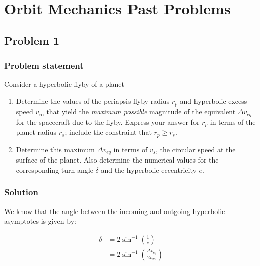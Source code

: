\newcommand{\v}[1]{\mathbf{#1}}
\newcommand{\dv}[1]{\dot{\v{#1}}}
\newcommand{\ddv}[1]{\ddot{\v{#1}}}
\newcommand{\uv}[1]{\hat{\v{#1}}}



\maketitle

\section{Orbit Mechanics Past Problems}

\subsection{Problem 1}

\subsubsection{Problem statement}
Consider a hyperbolic flyby of a planet

\begin{enumerate}
    \item Determine the values of the periapsis flyby radius $r_p$ and hyperbolic excess speed $v_\infty$ that yield the \textit{maximum possible} magnitude of the equivalent $\Delta v_{eq}$ for the spacecraft due to the flyby. Express your answer for $r_p$ in terms of the planet radius $r_s$; include the constraint that $r_p \geq r_s$.
    \item Determine this maximum $\Delta v_{eq}$ in terms of $v_s$, the circular speed at the surface of the planet. Also determine the numerical values for the corresponding turn angle $\delta$ and the hyperbolic eccentricity $e$.
\end{enumerate}

\subsubsection{Solution}

We know that the angle between the incoming and outgoing hyperbolic asymptotes is given by:

\begin{align*}
    \delta &= 2 \sin^{-1} \left( \frac{1}{e} \right) \\
    &= 2 \sin^{-1} \left( \frac{\Delta v_{eq}}{2 v_\infty} \right)
\end{align*}

